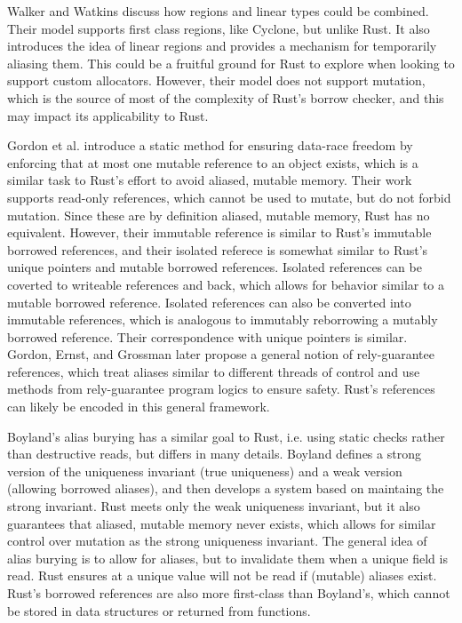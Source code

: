 Walker and Watkins discuss how regions and linear types could be combined. \cite{regionsandlinear}
Their model supports first class regions, like Cyclone, but unlike Rust.
It also introduces the idea of linear regions and provides a mechanism for
temporarily aliasing them. This could be a fruitful ground for Rust to explore
when looking to support custom allocators.
However, their model does not support mutation, which is the source of most of the complexity
of Rust's borrow checker, and this may impact its applicability to Rust. 

Gordon et al. \cite{uniqueandrefimm} introduce a static method for ensuring data-race freedom
by enforcing that at most one mutable reference to an object exists, which is a similar task
to Rust's effort to avoid aliased, mutable memory.
Their work supports read-only references, which cannot be used to mutate, but do not forbid
mutation. Since these are by definition aliased, mutable memory, Rust has no equivalent.
However, their immutable reference is similar to Rust's immutable borrowed references,
and their isolated referece is somewhat similar to Rust's unique pointers and mutable
borrowed references. Isolated references can be coverted to writeable references and back,
which allows for behavior similar to a mutable borrowed reference. Isolated references
can also be converted into immutable references, which is analogous to immutably reborrowing
a mutably borrowed reference. Their correspondence with unique pointers is similar.
Gordon, Ernst, and Grossman \cite{relyguarantee} later propose a general notion of
rely-guarantee references, which treat aliases similar to different threads of control
and use methods from rely-guarantee program logics to ensure safety. Rust's references
can likely be encoded in this general framework.

Boyland's alias burying \cite{aliasburying} has a similar goal to Rust, i.e.
using static checks rather than destructive reads, but differs in many details.
Boyland defines a strong version of the uniqueness invariant (true uniqueness) and a weak
version (allowing borrowed aliases), and then develops a system based on maintaing
the strong invariant. Rust meets only the weak uniqueness invariant, but it also
guarantees that aliased, mutable memory never exists, which allows for similar control
over mutation as the strong uniqueness invariant. The general idea of alias burying
is to allow for aliases, but to invalidate them when a unique field is read.
Rust ensures at a unique value will not be read if (mutable) aliases exist.
Rust's borrowed references are also more first-class than Boyland's, which cannot
be stored in data structures or returned from functions.

